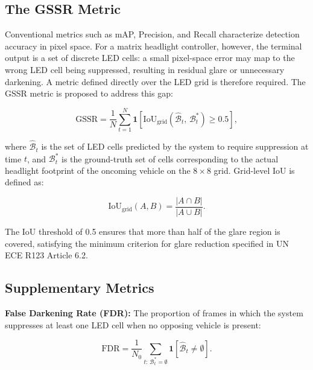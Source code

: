 \documentclass{jstarticle}
\theoremstyle{remark}
\begin{document}
\subsection{The GSSR Metric}
\label{subsec:gssr}

Conventional metrics such as mAP, Precision, and Recall characterize
detection accuracy in pixel space. For a matrix headlight controller,
however, the terminal output is a set of discrete LED cells: a small
pixel-space error may map to the wrong LED cell being suppressed,
resulting in residual glare or unnecessary darkening. A metric defined
directly over the LED grid is therefore required. The GSSR metric is
proposed to address this gap:

\begin{equation}
\mathrm{GSSR} = \frac{1}{N} \sum_{t=1}^{N}
\mathbf{1}\!\left[
  \mathrm{IoU}_{\mathrm{grid}}\!\left(\hat{\mathcal{B}}_t,\,
  \mathcal{B}^{*}_t\right) \geq 0.5
\right],
\label{eq:gssr}
\end{equation}

\noindent where $\hat{\mathcal{B}}_t$ is the set of LED cells predicted
by the system to require suppression at time $t$, and
$\mathcal{B}^{*}_t$ is the ground-truth set of cells corresponding to
the actual headlight footprint of the oncoming vehicle on the
$8 \times 8$ grid. Grid-level IoU is defined as:

\begin{equation}
\mathrm{IoU}_{\mathrm{grid}}(A,B) =
\frac{|A \cap B|}{|A \cup B|}.
\label{eq:grid_iou}
\end{equation}

The IoU threshold of 0.5 ensures that more than half of the glare
region is covered, satisfying the minimum criterion for glare reduction
specified in UN ECE R123 Article 6.2.

\subsection{Supplementary Metrics}
\label{subsec:metrics}

\noindent\textbf{False Darkening Rate (FDR):}
The proportion of frames in which the system suppresses at least one
LED cell when no opposing vehicle is present:

\begin{equation}
\mathrm{FDR} = \frac{1}{N_0}
\sum_{t:\, \mathcal{B}^{*}_t = \emptyset}
\mathbf{1}\!\left[\hat{\mathcal{B}}_t \neq \emptyset\right].
\label{eq:fdr}
\end{equation}
\end{document}
